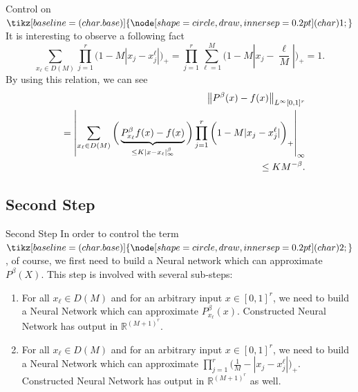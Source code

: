 \documentclass{if-beamer}
\newcommand*\circled[1]{\tikz[baseline=(char.base)]{
            \node[shape=circle,draw,inner sep=0.2pt] (char) {#1};}}
\begin{document}
\begin{frame}{Control on $\circled{1}$}
    It is interesting to observe a following fact
    \begin{equation*}
        \sum_{x_{\ell}\in D(M)}\prod_{j=1}^{r}\bigg( 1- M|x_{j}-x_{j}^{\ell}| \bigg)_{+}
        =\prod_{j=1}^{r}\sum_{\ell=1}^{M}\bigg( 1- M\left|x_{j}-\frac{\ell}{M}\right| \bigg)_{+}=1.
    \end{equation*}
    By using this relation, we can see
    \begin{eqnarray*}
        \tiny
        &&\left\| P^{\beta}(x) - f(x) \right\|_{L^\infty[0,1]^{r}} \\ 
        &&=\left| \sum_{x_{\ell}\in D(M)}\bigg(\underbrace{P_{x_{\ell}}^{\beta}f(x)-f(x)}_{\leq K|x-x_{\ell}|_{\infty}^{\beta}}\bigg)\prod_{j=1}^{r}\bigg( 1- M|x_{j}-x_{j}^{\ell}| \bigg)_{+} \right|_{\infty} \\
        &&\leq KM^{-\beta}.
    \end{eqnarray*}
\end{frame}

\subsection{Second Step}
\begin{frame}{Second Step}
    In order to control the term $\circled{2}$, of course, we first need to build a Neural network which can approximate $P^{\beta}(X)$. This step is involved with several sub-steps:
    \begin{enumerate}
        \item For all $x_{\ell}\in D(M)$ and for an arbitrary input $x\in [0,1]^{r}$, we need to build a Neural Network which can approximate $P^{\beta}_{x_\ell}(x)$. 
        Constructed Neural Network has output in $\mathbb{R}^{(M+1)^{r}}$.
        \item For all $x_{\ell}\in D(M)$ and for an arbitrary input $x\in [0,1]^{r}$, we need to build a Neural Network which can approximate $\prod_{j=1}^{r}\bigg( \frac{1}{M}- |x_{j}-x_{j}^{\ell}| \bigg)_{+}$. 
        Constructed Neural Network has output in $\mathbb{R}^{(M+1)^{r}}$ as well.
    \end{enumerate}
\end{frame}
\end{document}
